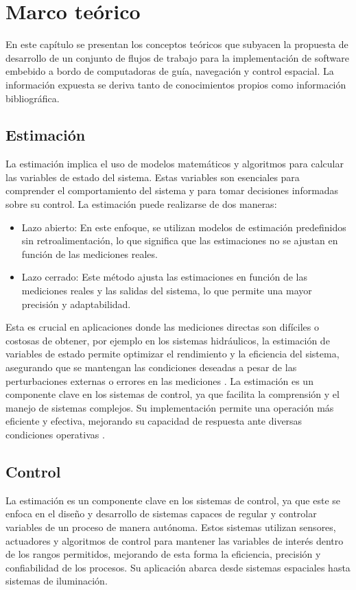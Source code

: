 \chapter{Marco teórico}
\label{ch:marco}

En este capítulo se presentan los conceptos teóricos que subyacen la propuesta de desarrollo de un conjunto de flujos de trabajo para la implementación de software embebido 
a bordo de computadoras de guía, navegación y control espacial. La información expuesta se deriva tanto de conocimientos propios como información bibliográfica.

\section{Estimación}
La estimación implica el uso de modelos matemáticos y algoritmos para calcular las variables de estado del sistema. Estas variables son esenciales para comprender 
el comportamiento del sistema y para tomar decisiones informadas sobre su control. La estimación puede realizarse de dos maneras:

\begin{itemize}
    \item Lazo abierto: En este enfoque, se utilizan modelos de estimación predefinidos sin retroalimentación, lo que significa que las estimaciones no se ajustan en función
    de las mediciones reales.
    \item Lazo cerrado: Este método ajusta las estimaciones en función de las mediciones reales y las salidas del sistema, lo que permite una mayor precisión y adaptabilidad.
\end{itemize}

Esta es crucial en aplicaciones donde las mediciones directas son difíciles o costosas de obtener, por ejemplo en los sistemas hidráulicos, la estimación de variables de 
estado permite optimizar el rendimiento y la eficiencia del sistema, asegurando que se mantengan las condiciones deseadas a pesar de las perturbaciones externas o errores en las 
mediciones \cite{Merchn2019EvaluacinDM}. La estimación es un componente clave en los sistemas de control, ya que facilita la comprensión y el manejo de sistemas complejos. 
Su implementación permite una operación más eficiente y efectiva, mejorando su capacidad de respuesta ante diversas condiciones operativas \cite{Mesa2020EstimacinDV}.

\section{Control}
La estimación es un componente clave en los sistemas de control, ya que este se enfoca en el diseño y desarrollo de sistemas capaces de regular y controlar variables de un proceso de manera autónoma. Estos sistemas utilizan sensores, actuadores y algoritmos de control para mantener las variables de interés dentro de los rangos permitidos, mejorando de esta forma la eficiencia, precisión y confiabilidad de los procesos. Su aplicación abarca desde sistemas espaciales hasta sistemas de iluminación. 


